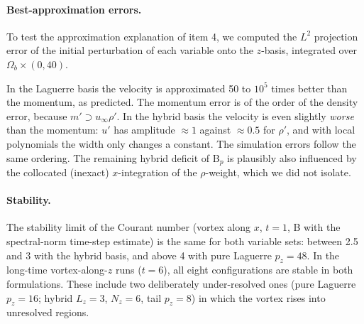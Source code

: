 \documentclass[11pt,a4paper]{article}
\begin{document}
\paragraph{Best-approximation errors.}
To test the approximation explanation of item 4, we computed the $L^2$ projection
error of the initial perturbation of each variable onto the $z$-basis, integrated
over $\Omega_b\times(0,40)$.
\begin{center}
\end{center}
In the Laguerre basis the velocity is approximated 50 to $10^5$ times better than
the momentum, as predicted. The momentum error is of the order of the density
error, because $m'\supset u_\infty\rho'$. In the hybrid basis the velocity is even
slightly \emph{worse} than the momentum: $u'$ has amplitude $\approx1$ against
$\approx0.5$ for $\rho'$, and with local polynomials the width only changes a
constant. The simulation errors follow the same ordering. The remaining hybrid
deficit of B$_p$ is plausibly also influenced by the collocated (inexact)
$x$-integration of the $\rho$-weight, which we did not isolate.

\paragraph{Stability.}
The stability limit of the Courant number (vortex along $x$, $t=1$, B with the
spectral-norm time-step estimate) is the same for both variable sets: between 2.5
and 3 with the hybrid basis, and above 4 with pure Laguerre $p_z=48$. In the
long-time vortex-along-$z$ runs ($t=6$), all eight configurations are stable in both
formulations. These include two deliberately under-resolved ones (pure Laguerre
$p_z=16$; hybrid $L_z=3$, $N_z=6$, tail $p_z=8$) in which the vortex rises into
unresolved regions.
\end{document}
